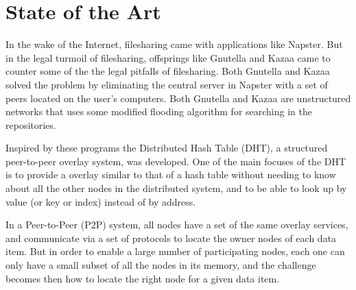 
\section{State of the Art}
\label{sec:State-of-the-art}
\label{sec:Theory}


In the wake of the Internet, filesharing came with applications like
 Napster\cite{napster-new-homepage}.
 But in the legal turmoil of filesharing\cite{napster-legal-homepage},
 offsprings like Gnutella\cite{gnutella-homepage} and Kazaa\cite{kazaa-homepage}
 came to counter some of the the legal pitfalls of filesharing.
 Both Gnutella and Kazaa solved the problem
 by eliminating the central server in Napster with a set of peers
 located on the user's computers. Both Gnutella and Kazaa are unstructured
 networks that uses some modified flooding algorithm for searching in the
 repositories.

Inspired by these programs the Distributed Hash Table (DHT), a structured
 peer-to-peer overlay system, was developed. One of the main
 focuses of the DHT is to provide a  overlay similar to that of
 a  hash table without needing to know about all the other nodes
 in the
 distributed system, and to be able to look up by value (or key or index) instead
 of by address.

In a Peer-to-Peer (P2P) system, all nodes have a set of the same overlay services,
 and communicate via a set of protocols to locate the owner nodes of each
 data item.
 But in order to enable a large number of participating nodes,
 each one can only have a small
 subset of all the nodes in its memory, and the challenge becomes then how to
 locate the right node for a given data item.

